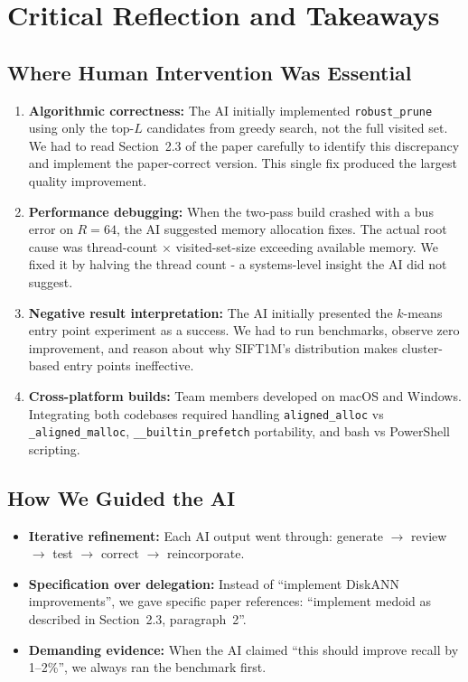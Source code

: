\documentclass[10pt]{article}
\begin{document}
\section{Critical Reflection and Takeaways}

\subsection{Where Human Intervention Was Essential}

\begin{enumerate}
    \item \textbf{Algorithmic correctness:} The AI initially implemented \texttt{robust\_prune} using only the top-$L$ candidates from greedy search, not the full visited set. We had to read Section~2.3 of the paper carefully to identify this discrepancy and implement the paper-correct version. This single fix produced the largest quality improvement.
    
    \item \textbf{Performance debugging:} When the two-pass build crashed with a bus error on $R=64$, the AI suggested memory allocation fixes. The actual root cause was thread-count $\times$ visited-set-size exceeding available memory. We fixed it by halving the thread count - a systems-level insight the AI did not suggest.
    
    \item \textbf{Negative result interpretation:} The AI initially presented the $k$-means entry point experiment as a success. We had to run benchmarks, observe zero improvement, and reason about why SIFT1M's distribution makes cluster-based entry points ineffective.
    
    \item \textbf{Cross-platform builds:} Team members developed on macOS and Windows. Integrating both codebases required handling \texttt{aligned\_alloc} vs \texttt{\_aligned\_malloc}, \texttt{\_\_builtin\_prefetch} portability, and bash vs PowerShell scripting.
\end{enumerate}

\subsection{How We Guided the AI}

\begin{itemize}
    \item \textbf{Iterative refinement:} Each AI output went through: generate $\to$ review $\to$ test $\to$ correct $\to$ reincorporate.
    \item \textbf{Specification over delegation:} Instead of ``implement DiskANN improvements'', we gave specific paper references: ``implement medoid as described in Section~2.3, paragraph~2''.
    \item \textbf{Demanding evidence:} When the AI claimed ``this should improve recall by 1--2\%'', we always ran the benchmark first.
\end{itemize}
\end{document}
